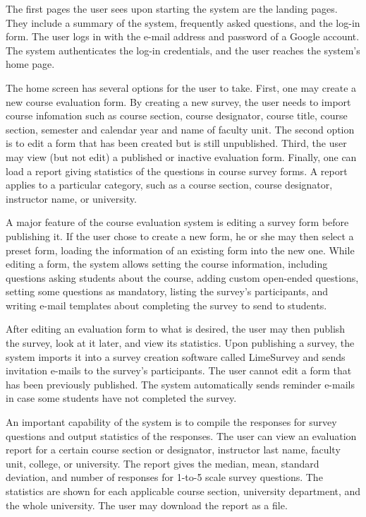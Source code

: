 \documentclass{article}
\begin{document}
The first pages the user sees upon starting the system are the landing pages. They include a summary of the system, frequently asked questions, and the log-in form. The user logs in with the e-mail address and password of a Google account. The system authenticates the log-in credentials, and the user reaches the system's home page.

The home screen has several options for the user to take. First, one may create a new course evaluation form. By creating a new survey, the user needs to import course infomation such as course section, course designator, course title, course section, semester and calendar year and name of faculty unit. The second option is to edit a form that has been created but is still unpublished. Third, the user may view (but not edit) a published or inactive evaluation form. Finally, one can load a report giving statistics of the questions in course survey forms. A report applies to a particular category, such as a course section, course designator, instructor name, or university.

A major feature of the course evaluation system is editing a survey form before publishing it. If the user chose to create a new form, he or she may then select a preset form, loading the information of an existing form into the new one. While editing a form, the system allows setting the course information, including questions asking students about the course, adding custom open-ended questions, setting some questions as mandatory, listing the survey's participants, and writing e-mail templates about completing the survey to send to students.

After editing an evaluation form to what is desired, the user may then publish the survey, look at it later, and view its statistics. Upon publishing a survey, the system imports it into a survey creation software called LimeSurvey and sends invitation e-mails to the survey's participants. The user cannot edit a form that has been previously published. The system automatically sends reminder e-mails in case some students have not completed the survey.

An important capability of the system is to compile the responses for survey questions and output statistics of the responses. The user can view an evaluation report for a certain course section or designator, instructor last name, faculty unit, college, or university. The report gives the median, mean, standard deviation, and number of responses for 1-to-5 scale survey questions. The statistics are shown for each applicable course section, university department, and the whole university. The user may download the report as a file.
\end{document}
